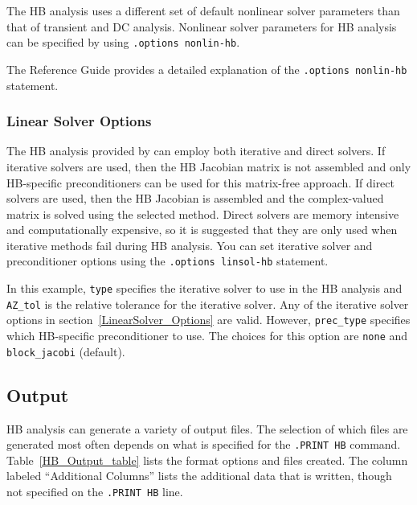 The HB analysis uses a different set of default nonlinear solver
parameters than that of transient and DC analysis. Nonlinear solver
parameters for HB analysis can be specified by using
\verb|.options nonlin-hb|.


The \Xyce{} Reference Guide\ReferenceGuide{} provides a detailed
explanation of the \verb|.options nonlin-hb| statement.

\subsubsection{Linear Solver Options}

The HB analysis provided by \Xyce{} can employ both iterative and
direct solvers.  If iterative solvers are used, then the HB Jacobian
matrix is not assembled and only HB-specific preconditioners can be
used for this matrix-free approach.  If direct solvers are used, then
the HB Jacobian is assembled and the complex-valued matrix is solved
using the selected method.  Direct solvers are memory intensive and
computationally expensive, so it is suggested that they are only used
when iterative methods fail during HB analysis.  You can set iterative
solver and preconditioner options using the \verb|.options linsol-hb|
statement.


In this example, \texttt{type} specifies the iterative solver to use
in the HB analysis and \texttt{AZ\_tol} is the relative tolerance for
the iterative solver.  Any of the iterative solver options in
section~\ref{LinearSolver_Options} are valid.  However,
\texttt{prec\_type} specifies which HB-specific preconditioner to
use. The choices for this option are \texttt{none} and
\texttt{block\_jacobi} (default).

\subsection{Output}
\label{HB_Output}

HB analysis can generate a variety of output files.  The selection of
which files are generated most often depends on what is specified for
the \texttt{.PRINT HB} command.  Table~\ref{HB_Output_table} lists the
format options and files created.  The column labeled ``Additional
Columns'' lists the additional data that is written, though not
specified on the \texttt{.PRINT HB} line.

